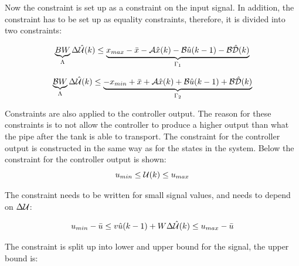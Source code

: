 


 Now the constraint is set up as a constraint on the input signal. In addition, the constraint has to be set up as equality constraints, therefore, it is divided into two constraints: 

 \begin{equation}
 \underbrace{BW}_{\Lambda} \Delta\hat{\CMcal{U}}(k)\leq \underbrace{x_{max}- \bar{x}-\CMcal{A}\hat{x}(k)-\CMcal{B}\hat{u}(k-1)-\CMcal{B}\hat{\CMcal{D}}(k)}_{\Gamma_1}
 \end{equation}  

 \begin{equation}
 \underbrace{\CMcal{B}W}_{\Lambda} \Delta\hat{\CMcal{U}}(k) \leq \underbrace{-x_{min}+\bar{x}+\CMcal{A}\hat{x}(k)+\CMcal{B}\hat{u}(k-1)+\CMcal{B}\hat{\CMcal{D}}(k)}_{\Gamma_2}
 \end{equation}


Constraints are also applied to the controller output. The reason for these constraints is to not allow the controller to produce a higher output than what the pipe after the tank is able to transport. The constraint for the controller output is constructed in the same way as for the states in the system. Below the constraint for the controller output is shown:  
 \begin{equation}
 	u_{min} \leq \CMcal{U}(k) \leq u_{max}
 \end{equation}

The constraint needs to be written for small signal values, and needs to depend on $\Delta \CMcal{U}$:

 \begin{equation}
 		u_{min} -  \bar{u} \leq v\hat{u}(k-1)+ W\Delta\hat{\CMcal{U}}(k)  \leq  u_{max} -  \bar{u}
 \end{equation}

The constraint is split up into lower and upper bound for the signal, the upper bound is:

